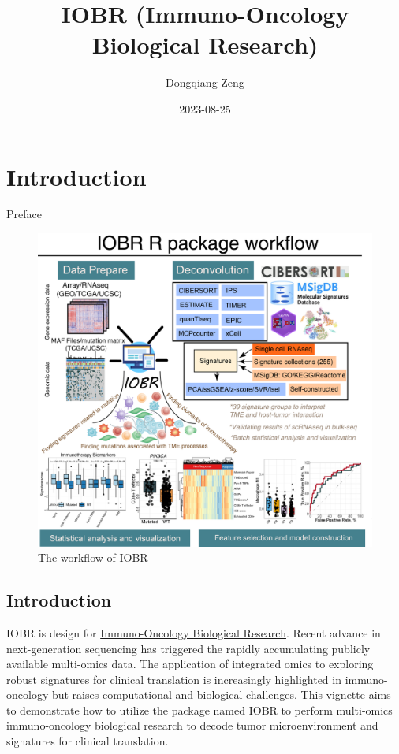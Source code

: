 \documentclass[
  12pt,
]{book}
\title{IOBR (Immuno-Oncology Biological Research)}
\author{Dongqiang Zeng}
\date{2023-08-25}
\begin{document}
\maketitle

{
\setcounter{tocdepth}{1}
\tableofcontents
}
\hypertarget{introduction}{%
\chapter*{\texorpdfstring{\textbf{Introduction}}{Introduction}}\label{introduction}}

Preface

\begin{figure}

{\centering \includegraphics[width=0.95\linewidth]{./fig/IOBR-Workflow} 

}

\caption{The workflow of IOBR}\label{fig:unnamed-chunk-1}
\end{figure}

\hypertarget{introduction-1}{%
\section{Introduction}\label{introduction-1}}

IOBR is design for \href{https://github.com/IOBR/IOBR}{Immuno-Oncology Biological Research}.
Recent advance in next-generation sequencing has triggered the rapidly accumulating publicly available multi-omics data. The application of integrated omics to exploring robust signatures for clinical translation is increasingly highlighted in immuno-oncology but raises computational and biological challenges. This vignette aims to demonstrate how to utilize the package named IOBR to perform multi-omics immuno-oncology biological research to decode tumor microenvironment and signatures for clinical translation.
\end{document}
